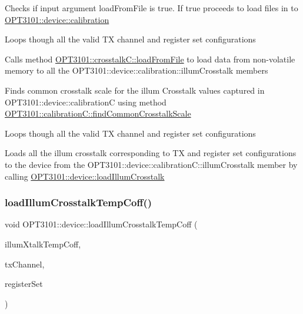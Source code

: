\begin{DoxyItemize}
\item Checks if input argument load\+From\+File is true. If true proceeds to load files in to \mbox{\hyperlink{class_o_p_t3101_1_1device_a808c6e99f30fc4f21bee018f351f560d}{O\+P\+T3101\+::device\+::calibration}}
\item Loops though all the valid TX channel and register set configurations
\item Calls method \mbox{\hyperlink{class_o_p_t3101_1_1crosstalk_c_a8927a7e31870bf41a64d8b1755c6b0b2}{O\+P\+T3101\+::crosstalk\+C\+::load\+From\+File}} to load data from non-\/volatile memory to all the O\+P\+T3101\+::device\+::calibration\+::illum\+Crosstalk members
\item Finds common crosstalk scale for the illum Crosstalk values captured in O\+P\+T3101\+::device\+::calibrationC using method \mbox{\hyperlink{class_o_p_t3101_1_1calibration_c_ae2c3f2786e65315d817b8953380e33b6}{O\+P\+T3101\+::calibration\+C\+::find\+Common\+Crosstalk\+Scale}}
\item Loops though all the valid TX channel and register set configurations
\item Loads all the illum crosstalk corresponding to TX and register set configurations to the device from the O\+P\+T3101\+::device\+::calibration\+C\+::illum\+Crosstalk member by calling \mbox{\hyperlink{class_o_p_t3101_1_1device_acb915ffb10d3c725fe4a58f22d69d27d}{O\+P\+T3101\+::device\+::load\+Illum\+Crosstalk}} 
\end{DoxyItemize}\mbox{\label{class_o_p_t3101_1_1device_a450bc6b5bcd3e6b232d4352229a2829c}} 
\subsubsection{\texorpdfstring{load\+Illum\+Crosstalk\+Temp\+Coff()}{loadIllumCrosstalkTempCoff()}}
{\footnotesize\ttfamily void O\+P\+T3101\+::device\+::load\+Illum\+Crosstalk\+Temp\+Coff (\begin{DoxyParamCaption}\item[{\mbox{\hyperlink{class_o_p_t3101_1_1crosstalk_temp_coff_c}{O\+P\+T3101\+::crosstalk\+Temp\+CoffC}} $\ast$}]{illum\+Xtalk\+Temp\+Coff,  }\item[{uint8\+\_\+t}]{tx\+Channel,  }\item[{char}]{register\+Set }\end{DoxyParamCaption})}



